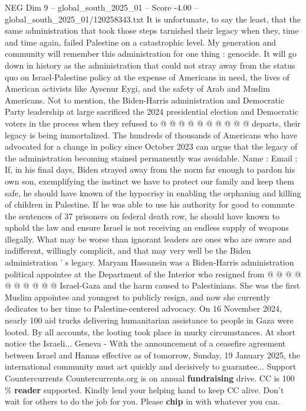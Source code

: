 \begin{textsample}{NEG Dim 9 – global\_south\_2025\_01 – Score -4.00 – global\_south\_2025\_01/120258343.txt}
It is unfortunate, to say the least, that the same administration that took those steps tarnished their legacy when they, time and time again, failed Palestine on a catastrophic level.
My generation and community will remember this administration for one thing : genocide.
It will go down in history as the administration that could not stray away from the status quo on Israel-Palestine policy at the expense of Americans in need, the lives of American activists like Aysenur Eygi, and the safety of Arab and Muslim Americans.
Not to mention, the Biden-Harris administration and Democratic Party leadership at large sacrificed the 2024 presidential election and Democratic voters in the process when they refused to @ @ @ @ @ @ @ @ @ @ departs, their legacy is being immortalized.
The hundreds of thousands of Americans who have advocated for a change in policy since October 2023 can argue that the legacy of the administration becoming stained permanently was avoidable.
Name : Email : If, in his final days, Biden strayed away from the norm far enough to pardon his own son, exemplifying the instinct we have to protect our family and keep them safe, he should have known of the hypocrisy in enabling the orphaning and killing of children in Palestine.
If he was able to use his authority for good to commute the sentences of 37 prisoners on federal death row, he should have known to uphold the law and ensure Israel is not receiving an endless supply of weapons illegally.
What may be worse than ignorant leaders are ones who are aware and indifferent, willingly complicit, and that may very well be the Biden administration ' s legacy.
Maryam Hassanein was a Biden-Harris administration political appointee at the Department of the Interior who resigned from @ @ @ @ @ @ @ @ @ @ Israel-Gaza and the harm caused to Palestinians.
She was the first Muslim appointee and youngest to publicly resign, and now she currently dedicates to her time to Palestine-centered advocacy.
On 16 November 2024, nearly 100 aid trucks delivering humanitarian assistance to people in Gaza were looted.
By all accounts, the looting took place in murky circumstances.
At short notice the Israeli...
Geneva - With the announcement of a ceasefire agreement between Israel and Hamas effective as of tomorrow, Sunday, 19 January 2025, the international community must act quickly and decisively to guarantee...
Support Countercurrents Countercurrents.org is on annual \textbf{fundraising} drive.
CC is 100 \% \textbf{reader} supported.
Kindly lend your helping hand to keep CC alive.
Don't wait for others to do the job for you.
Please \textbf{chip} in with whatever you can.

\end{textsample}

